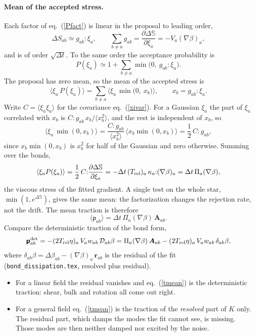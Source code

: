 \documentclass[11pt,aps,preprint,nofootinbib,superscriptaddress,tightenlines]{revtex4-2}
\def\st{\begin{equation}}
\def\stp{\end{equation}}
\def\Eq#1{eq.~(\ref{#1})}
\newcommand{\pf}{\bm{\mathsf p}}
\newcommand{\avg}[1]{\langle #1\rangle}
\let\oldparagraph\paragraph
\renewcommand{\paragraph}{\par\bigskip\oldparagraph}
\begin{document}
\paragraph{Mean of the accepted stress.}  Each factor of \Eq{Pfact} is linear in
the proposal to leading order,
\st
\Delta S_{ab}\simeq g_{ab}{:}\xi_a ,\qquad
\sum_{b\neq a}g_{ab}=\frac{\partial\Delta\mathbb S}{\partial\xi_a}=-V_a(\nabla\beta)_a ,
\stp
and is of order $\sqrt{\Delta t}$.  To the same order the acceptance probability
is
\st
P(\xi_a)\simeq1+\sum_{b\neq a}\min\big(0,\ g_{ab}{:}\xi_a\big).
\stp
The proposal has zero mean, so the mean of the accepted stress is
\st
\avg{\xi_a\,P(\xi_a)}=\sum_{b\neq a}\avg{\xi_a\,\min\big(0,\ x_b\big)},\qquad
x_b=g_{ab}{:}\xi_a .
\stp
Write $C=\avg{\xi_a\xi_a}$ for the covariance \Eq{xivar}.  For a Gaussian $\xi_a$
the part of $\xi_a$ correlated with $x_b$ is $C{:}g_{ab}\,x_b/\avg{x_b^2}$, and the
rest is independent of $x_b$, so
\st
\avg{\xi_a\,\min(0,x_b)}=\frac{C{:}g_{ab}}{\avg{x_b^2}}\,\avg{x_b\min(0,x_b)}
=\frac12\,C{:}g_{ab} ,
\stp
since $x_b\min(0,x_b)$ is $x_b^2$ for half of the Gaussian and zero otherwise.
Summing over the bonds,
\st
\avg{\xi_aP(\xi_a)}=\frac12\,C{:}\frac{\partial\Delta\mathbb S}{\partial\xi_a}
=-\Delta t\,(T_{\rm rel})_a\,\kappa_a{:}(\nabla\beta)_a=\Delta t\,\Pi_a(\nabla\beta) ,
\stp
the viscous stress of the fitted gradient.  A single test on the whole star,
$\min(1,e^{\Delta\mathbb S})$, gives the same mean: the factorization changes
the rejection rate, not the drift.  The mean traction is therefore
\st
\avg{\pf_{ab}}=\Delta t\,\Pi_a(\nabla\beta)\,\bm A_{ab} .
\label{tmean}
\stp
Compare the deterministic traction of the bond form,
\st
\pf_{ab}^{\rm det}=-(2T_{\rm rel}\eta)_a\,V_aw_{ab}\,\mathcal D_{ab}\beta
=\Pi_a(\nabla\beta)\,\bm A_{ab}-(2T_{\rm rel}\eta)_a\,V_aw_{ab}\,\delta_{ab}\beta,
\stp
where $\delta_{ab}\beta=\Delta\beta_{ab}-(\nabla\beta)_a\,\bm r_{ab}$ is the residual of the fit
(\texttt{bond\_dissipation.tex}, resolved plus residual).
\begin{itemize}
\item For a linear field the residual vanishes and \Eq{tmean} is the
  deterministic traction: shear, bulk and rotation all come out right.
\item For a general field \Eq{tmean} is the traction of the \emph{resolved} part
  of $K$ only.  The residual part, which damps the modes the fit cannot see, is
  missing.  Those modes are then neither damped nor excited by the noise.
\end{itemize}
\end{document}
